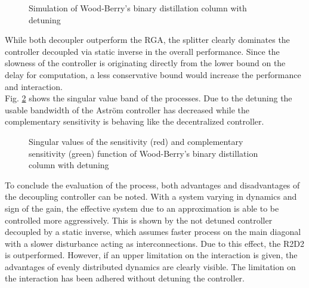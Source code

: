 %

\begin{figure}[H]\centering

\caption{Simulation of Wood-Berry's binary distillation column with detuning}
\label{c:fotd:s:woodberry:f:SimDetuned}
\end{figure}

While both decoupler outperform the RGA, the splitter clearly dominates the controller decoupled via static inverse in the overall performance. Since the slowness of the controller is originating directly from the lower bound on the delay for computation, a less conservative bound would increase the performance and interaction.\\

Fig. \ref{c:fotd:s:woodberry:f:SingValDetuned} shows the singular value band of the processes.  Due to the detuning the usable bandwidth of the Astr\"om controller has decreased while the complementary sensitivity is behaving like the decentralized controller.\\

\begin{figure}[H]\centering

\caption{Singular values of the sensitivity (red) and complementary sensitivity (green) function of Wood-Berry's binary distillation column with detuning}
\label{c:fotd:s:woodberry:f:SingValDetuned}
\end{figure}

To conclude the evaluation of the process, both advantages and disadvantages of the decoupling controller can be noted. With a system varying in dynamics and sign of the gain, the effective system due to an approximation is able to be controlled more aggressively. This is shown by the not detuned controller decoupled by a static inverse, which assumes faster process on the main diagonal with a slower disturbance acting as interconnections. Due to this effect, the R2D2 is outperformed. However, if an upper limitation on the interaction is given, the advantages of evenly distributed dynamics are clearly visible. The limitation on the interaction has been adhered without detuning the controller.\\

